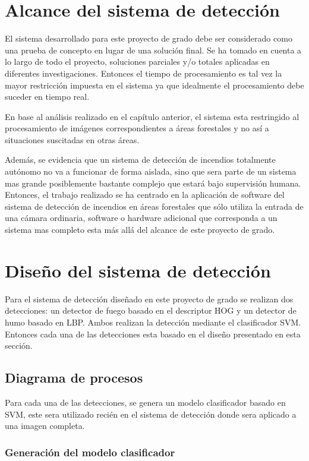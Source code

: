 \section{Alcance del sistema de detección}

El sistema desarrollado para este proyecto de grado debe ser considerado como una prueba de concepto en lugar de una solución final. Se ha tomado en cuenta a lo largo de todo el proyecto, soluciones parciales y/o totales aplicadas en diferentes investigaciones. Entonces el tiempo de procesamiento es tal vez la mayor restricción impuesta en el sistema ya que idealmente el procesamiento debe suceder en tiempo real.

En base al análisis realizado en el capítulo anterior, el sistema esta restringido al procesamiento de imágenes correspondientes a áreas forestales y no así a situaciones suscitadas en otras áreas.

Además, se evidencia que un sistema de detección de incendios totalmente autónomo no va a funcionar de forma aislada, sino que sera parte de un sistema mas grande posiblemente bastante complejo que estará bajo supervisión humana. Entonces, el trabajo realizado se ha centrado en la aplicación de software del sistema de detección de incendios en áreas forestales que sólo utiliza la entrada de una cámara ordinaria, software o hardware adicional que corresponda a un sistema mas completo esta más allá del alcance de este proyecto de grado.

\section{Diseño del sistema de detección}

Para el sistema de detección diseñado en este proyecto de grado se realizan dos detecciones: un detector de fuego basado en el descriptor HOG y un detector de humo basado en LBP. Ambos realizan la detección mediante el clasificador SVM. Entonces cada una de las detecciones esta basado en el diseño presentado en esta sección.

\subsection{Diagrama de procesos}

Para cada una de las detecciones, se genera un modelo clasificador basado en SVM, este sera utilizado recién en el sistema de detección donde sera aplicado a una imagen completa.

\subsubsection{Generación del modelo clasificador}

